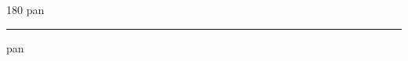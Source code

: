 
\begin{frame}
\begin{center}
\begin{turn}{180}
{\fontsize{2.5cm}{1em}\selectfont pan}
\end{turn}
\vspace{1em}\par  
\hrule
\vspace{1em}\par  
{\fontsize{2.5cm}{1em}\selectfont pan}
\end{center}
\end{frame}
